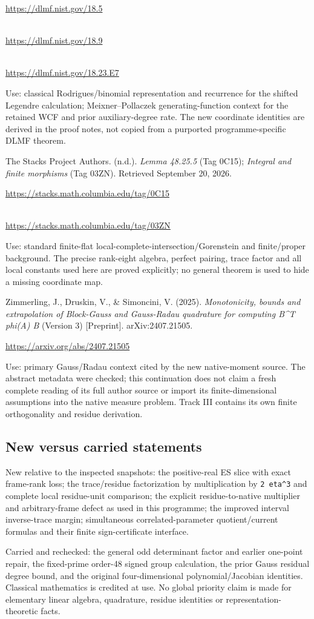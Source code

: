 \url{https://dlmf.nist.gov/18.5}\strut \\
\url{https://dlmf.nist.gov/18.9}\strut \\
\url{https://dlmf.nist.gov/18.23.E7}

Use: classical Rodrigues/binomial representation and recurrence for the
shifted Legendre calculation; Meixner--Pollaczek generating-function
context for the retained WCF and prior auxiliary-degree rate. The new
coordinate identities are derived in the proof notes, not copied from a
purported programme-specific DLMF theorem.

The Stacks Project Authors. (n.d.). \emph{Lemma 48.25.5} (Tag 0C15);
\emph{Integral and finite morphisms} (Tag 03ZN). Retrieved September 20,
2026.

\url{https://stacks.math.columbia.edu/tag/0C15}\strut \\
\url{https://stacks.math.columbia.edu/tag/03ZN}

Use: standard finite-flat local-complete-intersection/Gorenstein and
finite/proper background. The precise rank-eight algebra, perfect
pairing, trace factor and all local constants used here are proved
explicitly; no general theorem is used to hide a missing coordinate map.

Zimmerling, J., Druskin, V., \& Simoncini, V. (2025).
\emph{Monotonicity, bounds and extrapolation of Block-Gauss and
Gauss-Radau quadrature for computing B\^{}T phi(A) B} (Version 3)
{[}Preprint{]}. arXiv:2407.21505.

\url{https://arxiv.org/abs/2407.21505}

Use: primary Gauss/Radau context cited by the new native-moment source.
The abstract metadata were checked; this continuation does not claim a
fresh complete reading of its full author source or import its
finite-dimensional assumptions into the native measure problem. Track
III contains its own finite orthogonality and residue derivation.

\subsection{New versus carried
statements}\label{new-versus-carried-statements}

New relative to the inspected snapshots: the positive-real ES slice with
exact frame-rank loss; the trace/residue factorization by multiplication
by \texttt{2\ eta\^{}3} and complete local residue-unit comparison; the
explicit residue-to-native multiplier and arbitrary-frame defect as used
in this programme; the improved interval inverse-trace margin;
simultaneous correlated-parameter quotient/current formulas and their
finite sign-certificate interface.

Carried and rechecked: the general odd determinant factor and earlier
one-point repair, the fixed-prime order-48 signed group calculation, the
prior Gauss residual degree bound, and the original four-dimensional
polynomial/Jacobian identities. Classical mathematics is credited at
use. No global priority claim is made for elementary linear algebra,
quadrature, residue identities or representation-theoretic facts.
